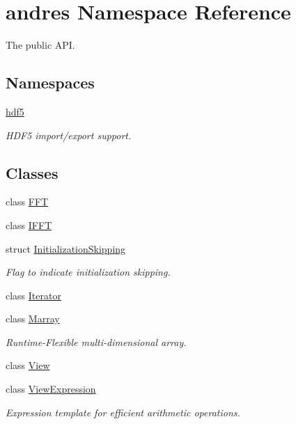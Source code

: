 \hypertarget{namespaceandres}{}\section{andres Namespace Reference}
\label{namespaceandres}


The public A\+PI.  


\subsection*{Namespaces}
\begin{DoxyCompactItemize}
\item 
 \hyperlink{namespaceandres_1_1hdf5}{hdf5}
\begin{DoxyCompactList}\small\item\em H\+D\+F5 import/export support. \end{DoxyCompactList}\end{DoxyCompactItemize}
\subsection*{Classes}
\begin{DoxyCompactItemize}
\item 
class \hyperlink{classandres_1_1FFT}{F\+FT}
\item 
class \hyperlink{classandres_1_1IFFT}{I\+F\+FT}
\item 
struct \hyperlink{structandres_1_1InitializationSkipping}{Initialization\+Skipping}
\begin{DoxyCompactList}\small\item\em Flag to indicate initialization skipping. \end{DoxyCompactList}\item 
class \hyperlink{classandres_1_1Iterator}{Iterator}
\item 
class \hyperlink{classandres_1_1Marray}{Marray}
\begin{DoxyCompactList}\small\item\em Runtime-\/\+Flexible multi-\/dimensional array. \end{DoxyCompactList}\item 
class \hyperlink{classandres_1_1View}{View}
\item 
class \hyperlink{classandres_1_1ViewExpression}{View\+Expression}
\begin{DoxyCompactList}\small\item\em Expression template for efficient arithmetic operations. \end{DoxyCompactList}\end{DoxyCompactItemize}
